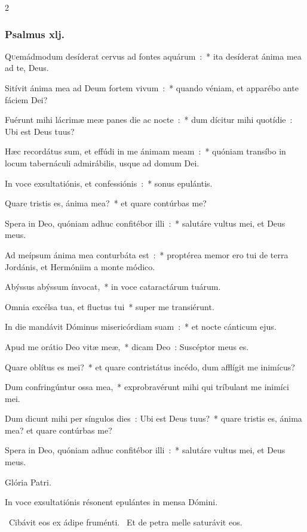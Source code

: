 \documentclass[9pt,twoside]{extarticle}
\begin{document}
\begin{multicols}{2}
\subsubsection*{\center Psalmus xlj.}
\lettrine{Q}uemádmodum desíderat cervus ad fontes aquárum~:~* ita desíderat ánima mea ad te, Deus.

Sitívit ánima mea ad Deum fortem vivum~:~* quando véniam, et apparébo ante fáciem Dei?

Fuérunt mihi lácrimæ meæ panes die ac nocte~:~* dum dícitur mihi quotídie~: Ubi est Deus tuus?

Hæc recordátus sum, et effúdi in me ánimam meam~:~* quóniam transíbo in locum tabernáculi admirábilis, usque ad domum Dei.

In voce exsultatiónis, et confessiónis~:~* sonus epulántis.

Quare tristis es, ánima mea?~* et quare contúrbas me?

Spera in Deo, quóniam adhuc confitébor illi~:~* salutáre vultus mei, et Deus meus.

Ad meípsum ánima mea conturbáta est~:~* proptérea memor ero tui de terra Jordánis, et Hermóniim a monte módico.

Abýssus abýssum ínvocat,~* in voce cataractárum tuárum.

Omnia excélsa tua, et fluctus tui~* super me transiérunt.

In die mandávit Dóminus misericórdiam suam~:~* et nocte cánticum ejus.

Apud me orátio Deo vitæ meæ,~* dicam Deo~: Suscéptor meus es.

Quare oblítus es mei?~* et quare contristátus incédo, dum afflígit me inimícus?

Dum confringúntur ossa mea,~* exprobravérunt mihi qui tríbulant me inimíci mei.

Dum dicunt mihi per síngulos dies~: Ubi est Deus tuus?~* quare tristis es, ánima mea? et quare contúrbas me?

Spera in Deo, quóniam adhuc confitébor illi~:~* salutáre vultus mei, et Deus meus.

Glória Patri.

\begin{tightlist}{}
\item {} In voce exsultatiónis résonent epulántes in mensa Dómini.
\item {}~Cibávit eos ex ádipe fruménti. ~Et de petra melle saturávit eos.
\end{tightlist}


\end{multicols}
\end{document}
